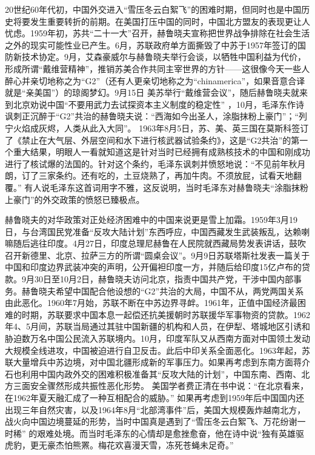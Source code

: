 \documentclass[UTF8, 12pt, a4paper]{ctexrep}
\begin{document}
20世纪60年代初，中国外交进入“雪压冬云白絮飞”的困难时期，但同时也是中国历史将要发生重要转折的前期。在美国打压中国的同时，中国北方盟友的表现更让人忧虑。1959年初，苏共“二十一大”召开，赫鲁晓夫宣称把世界战争排除在社会生活之外的现实可能性业已产生。6月，苏联政府单方面撕毁了中苏于1957年签订的国防新技术协定。9月，艾森豪威尔与赫鲁晓夫举行会谈，以牺牲中国利益为代价，形成所谓“戴维营精神”，推销苏美合作共同主宰世界的方针——这很像今天一些人醉心并亲切地称之为“G2”（还有人更亲切地称之为“chinamerica”，如果音意合译就是“亲美国”）的琼阁梦幻。9月15日 美苏举行“戴维营会议”，随后赫鲁晓夫就来到北京劝说中国“不要用武力去试探资本主义制度的稳定性” ，10月，毛泽东作诗讽刺正沉醉于“G2”共治的赫鲁晓夫说：“西海如今出圣人，涂脂抹粉上豪门”；“列宁火焰成灰烬，人类从此入大同”。 1963年8月5日，苏、美、英三国在莫斯科签订了《禁止在大气层、外层空间和水下进行核武器试验条约》，这是“G2共治”的第一个重大结果，明眼人一看就知道这是针对当时已经拥有成熟核技术的中国和刚成功进行了核试爆的法国的。针对这个条约，毛泽东讽刺并愤怒地说：“不见前年秋月朗，订了三家条约。还有吃的，土豆烧熟了，再加牛肉。不须放屁，试看天地翻覆。” 有人说毛泽东这首词用字不雅，这反说明，当时毛泽东对赫鲁晓夫“涂脂抹粉上豪门”的外交政策的愤怒已臻极点。

赫鲁晓夫的对华政策对正处经济困难中的中国来说更是雪上加霜。1959年3月19日，与台湾国民党准备“反攻大陆计划”东西呼应，中国西藏发生武装叛乱，达赖喇嘛随后逃往印度。4月27日，印度总理尼赫鲁在人民院就西藏局势发表讲话，鼓吹召开新德里、北京、拉萨三方的所谓“圆桌会议”。9月9日苏联塔斯社发表一篇关于中国和印度边界武装冲突的声明，公开偏袒印度一方，并随后给印度15亿卢布的贷款。9月30日至10月2日，赫鲁晓夫访问北京，指责中国共产党，干涉中国内部事务。赫鲁晓夫希望中国配合他设想的“G2”共治的大局，中国不从，两党两国关系由此恶化。1960年7月始，苏联不断在中苏边界寻衅。1961年，正值中国经济最困难的时期，苏联要求中国本息一起偿还抗美援朝时苏联援华军事物资的贷款。1962年4、5月间，苏联当局通过其驻中国新疆的机构和人员，在伊犁、塔城地区引诱和胁迫数万名中国公民流入苏联境内。10月，印度军队又从西南方面对中国领土发动大规模全线进攻，中国被迫进行自卫反击。此后中印关系全面恶化。1963年起，苏联大量增兵中苏边境，对中国北疆形成新的军事压力。如果再考虑到东南方面蒋介石也利用中国内政外交的困难积极准备其“反攻大陆的计划”，中国东南、西南、北方三面安全骤然形成共振性恶化形势。 美国学者费正清在书中说：“在北京看来，在1962年夏天融汇成了一种互相配合的威胁。” 如果再考虑到1959年后中国国内还出现三年自然灾害，以及1964年8月“北部湾事件”后，美国大规模轰炸越南北方，战火向中国边境蔓延的形势，当时中国真是遇到了“雪压冬云白絮飞、万花纷谢一时稀” 的艰难处境。而当时毛泽东的心情却是愈挫愈奋，他在诗中说“独有英雄驱虎豹，更无豪杰怕熊罴。梅花欢喜漫天雪，冻死苍蝇未足奇。”
\end{document}

